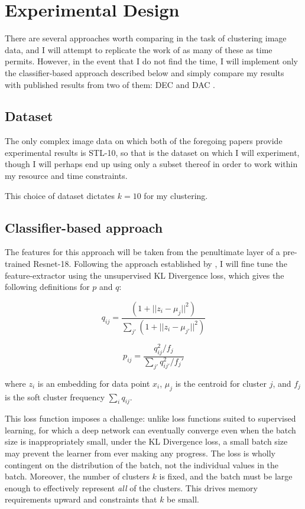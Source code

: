\documentclass{article}
\begin{document}
\section{Experimental Design}

There are several approaches worth comparing in the task of clustering image data, and I will attempt to replicate the work of as many of these as time permits. However, in the event that I do not find the time, I will implement only the classifier-based approach described below and simply compare my results with published results from two of them: DEC \cite{xie2016unsupervised} and DAC \cite{chang2017deep}.

\subsection{Dataset}

The only complex image data on which both of the foregoing papers provide experimental results is STL-10, so that is the dataset on which I will experiment, though I will perhaps end up using only a subset thereof in order to work within my resource and time constraints.

This choice of dataset dictates $k = 10$ for my clustering. %

\subsection{Classifier-based approach}

The features for this approach will be taken from the penultimate layer of a pre-trained Resnet-18. Following the approach established by \cite{xie2016unsupervised}, I will fine tune the feature-extractor using the unsupervised KL Divergence loss, which gives the following definitions for $p$ and $q$:

$$q_{ij} = 
\frac
{(1 + ||z_i - \mu_j||^2)}
{\sum_{j'}(1 + ||z_i - \mu_{j'}||^2)}
$$

$$
p_{ij} = \frac{q^2_{ij} / f_j}{ \sum_{j'}q^2_{ij'} / f_j' }
$$

where $z_i$ is an embedding for data point $x_i$, $\mu_j$ is the centroid for cluster $j$, and $f_j$ is the soft cluster frequency $\sum_i q_{ij}$.

This loss function imposes a challenge: unlike loss functions suited to supervised learning, for which a deep network can eventually converge even when the batch size is inappropriately small, under the KL Divergence loss, a small batch size may prevent the learner from ever making any progress. The loss is wholly contingent on the distribution of the batch, not the individual values in the batch. Moreover, the number of clusters $k$ is fixed, and the batch must be large enough to effectively represent \textit{all} of the clusters. This drives memory requirements upward and constraints that $k$ be small.
\end{document}
